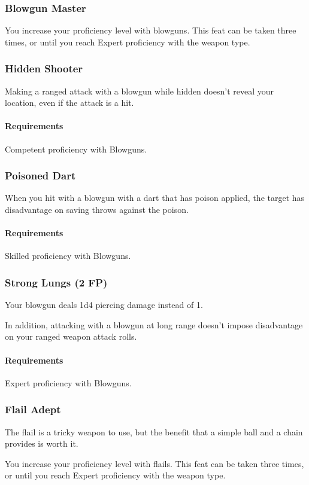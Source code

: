 \subsubsection{Blowgun Master} \label{feat::blowgunmaster}
    You increase your proficiency level with blowguns.
    This feat can be taken three times, or until you reach Expert proficiency with the weapon type.
\subsubsection{Hidden Shooter} \label{feat::hiddenshooter}
    Making a ranged attack with a blowgun while hidden doesn't reveal your location, even if the attack is a hit.
    \paragraph{Requirements} Competent proficiency with Blowguns.
\subsubsection{Poisoned Dart} \label{feat::poisoneddart}
    When you hit with a blowgun with a dart that has poison applied, the target has disadvantage on saving throws against the poison.
    \paragraph{Requirements} Skilled proficiency with Blowguns.
\subsubsection{Strong Lungs (2 FP)} \label{feat::stronglungs}
    Your blowgun deals 1d4 piercing damage instead of 1.

    In addition, attacking with a blowgun at long range doesn't impose disadvantage on your ranged weapon attack rolls.
    \paragraph{Requirements} Expert proficiency with Blowguns.
\subsubsection{Flail Adept} \label{feat::flailadept}
    The flail is a tricky weapon to use, but the benefit that a simple ball and a chain provides is worth it.

    You increase your proficiency level with flails.
    This feat can be taken three times, or until you reach Expert proficiency with the weapon type.
